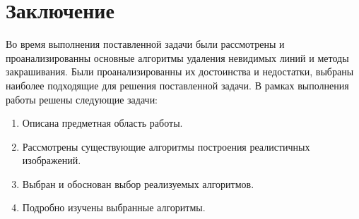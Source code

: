 \chapter*{Заключение}

Во время выполнения поставленной задачи были рассмотрены и проанализированны основные алгоритмы удаления невидимых линий и методы закрашивания. Были проанализированны их достоинства и недостатки, выбраны наиболее подходящие для решения поставленной задачи.
В рамках выполнения работы решены следующие задачи:

\begin{enumerate}
	\item Описана предметная область работы.
	\item Рассмотрены существующие алгоритмы построения реалистичных изображений.
	\item Выбран и обоснован выбор реализуемых алгоритмов.
	\item Подробно изучены выбранные алгоритмы.
\end{enumerate}